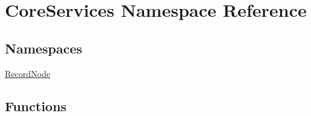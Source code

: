 \hypertarget{namespace_core_services}{}\section{Core\+Services Namespace Reference}
\label{namespace_core_services}
\subsection*{Namespaces}
\begin{DoxyCompactItemize}
\item 
 \mbox{\hyperlink{namespace_core_services_1_1_record_node}{Record\+Node}}
\end{DoxyCompactItemize}
\subsection*{Functions}
